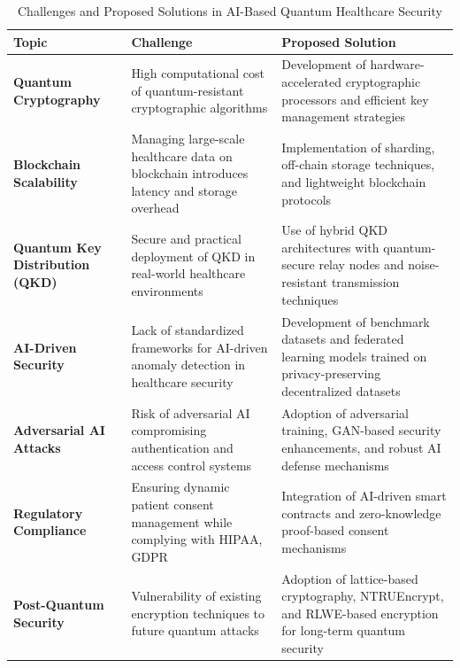 \documentclass[pdflatex,sn-mathphys-num]{sn-jnl}%
\theoremstyle{thmstyleone}%
\theoremstyle{thmstyletwo}%
\theoremstyle{thmstylethree}%
\begin{document}
\begin{table}[h!]
    \centering
    \caption{Challenges and Proposed Solutions in AI-Based Quantum Healthcare Security}
    \label{tab:challenges_solutions}
    \begin{tabular}{|p{2cm}|p{4.8cm}|p{4.8cm}|}
        \hline
        \textbf{Topic} & \textbf{Challenge} & \textbf{Proposed Solution} \\
        \hline
        \textbf{Quantum Cryptography} & High computational cost of quantum-resistant cryptographic algorithms & Development of hardware-accelerated cryptographic processors and efficient key management strategies \\
        \hline
        \textbf{Blockchain Scalability} & Managing large-scale healthcare data on blockchain introduces latency and storage overhead & Implementation of sharding, off-chain storage techniques, and lightweight blockchain protocols \\
        \hline
        \textbf{Quantum Key Distribution (QKD)} & Secure and practical deployment of QKD in real-world healthcare environments & Use of hybrid QKD architectures with quantum-secure relay nodes and noise-resistant transmission techniques \\
        \hline
        \textbf{AI-Driven Security} & Lack of standardized frameworks for AI-driven anomaly detection in healthcare security & Development of benchmark datasets and federated learning models trained on privacy-preserving decentralized datasets \\
        \hline
        \textbf{Adversarial AI Attacks} & Risk of adversarial AI compromising authentication and access control systems & Adoption of adversarial training, GAN-based security enhancements, and robust AI defense mechanisms \\
        \hline
        \textbf{Regulatory Compliance} & Ensuring dynamic patient consent management while complying with HIPAA, GDPR & Integration of AI-driven smart contracts and zero-knowledge proof-based consent mechanisms \\
        \hline
        \textbf{Post-Quantum Security} & Vulnerability of existing encryption techniques to future quantum attacks & Adoption of lattice-based cryptography, NTRUEncrypt, and RLWE-based encryption for long-term quantum security \\
        \hline
    \end{tabular}
\end{table}

\end{document}
